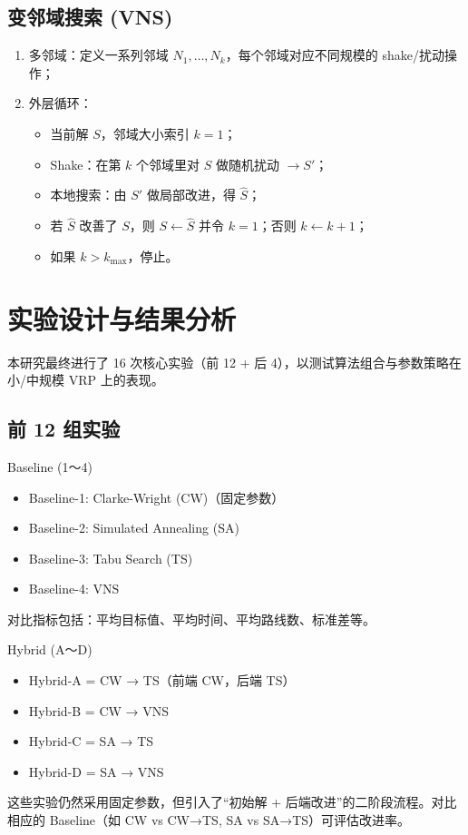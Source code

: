 \documentclass[12pt,a4paper,twoside]{ctexbook}
\begin{document}
\subsection{变邻域搜索 (VNS)}
\begin{enumerate}
    \item 多邻域：定义一系列邻域 $N_1,\dots,N_k$，每个邻域对应不同规模的 shake/扰动操作；
    \item 外层循环：
    \begin{itemize}
        \item 当前解 $S$，邻域大小索引 $k=1$；
        \item Shake：在第 $k$ 个邻域里对 $S$ 做随机扰动 $\to S'$；
        \item 本地搜索：由 $S'$ 做局部改进，得 $\widehat{S}$；
        \item 若 $\widehat{S}$ 改善了 $S$，则 $S \leftarrow \widehat{S}$ 并令 $k=1$；否则 $k \leftarrow k+1$；
        \item 如果 $k>k_{\max}$，停止。
    \end{itemize}
\end{enumerate}


\section{实验设计与结果分析}
本研究最终进行了 16 次核心实验（前 12 + 后 4），以测试算法组合与参数策略在小/中规模 VRP 上的表现。

\subsection{前 12 组实验}
{Baseline (1～4)}
\begin{itemize}
    \item Baseline-1: Clarke-Wright (CW)（固定参数）
    \item Baseline-2: Simulated Annealing (SA)
    \item Baseline-3: Tabu Search (TS)
    \item Baseline-4: VNS
\end{itemize}
对比指标包括：平均目标值、平均时间、平均路线数、标准差等。

{Hybrid (A～D)}
\begin{itemize}
    \item Hybrid-A = CW → TS（前端 CW，后端 TS）
    \item Hybrid-B = CW → VNS
    \item Hybrid-C = SA → TS
    \item Hybrid-D = SA → VNS
\end{itemize}
这些实验仍然采用固定参数，但引入了“初始解 + 后端改进”的二阶段流程。对比相应的 Baseline（如 CW vs CW→TS, SA vs SA→TS）可评估改进率。
\end{document}
